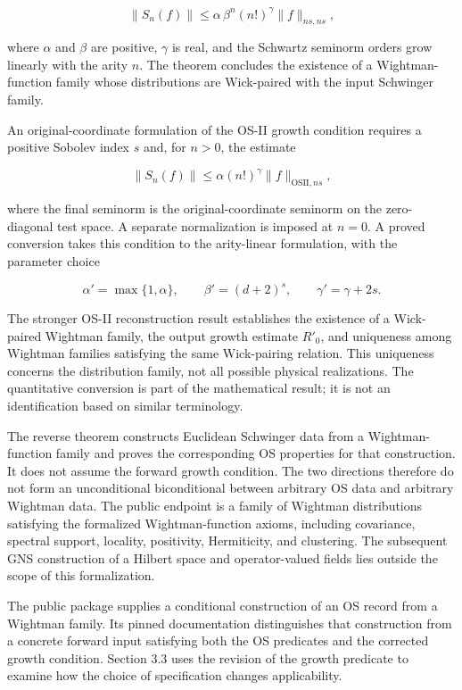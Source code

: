 \documentclass[pdflatex,sn-apa]{sn-jnl}
\begin{document}
\[
\|S_n(f)\|
\leq
\alpha\,\beta^n(n!)^\gamma
\|f\|_{ns,ns},
\]

where \(\alpha\) and \(\beta\) are positive, \(\gamma\) is real, and the Schwartz seminorm orders grow linearly with the arity \(n\). The theorem concludes the existence of a Wightman-function family whose distributions are Wick-paired with the input Schwinger family.

An original-coordinate formulation of the OS-II growth condition requires a positive Sobolev index \(s\) and, for \(n>0\), the estimate

\[
\|S_n(f)\|
\leq
\alpha (n!)^\gamma
\|f\|_{\mathrm{OSII},ns},
\]

where the final seminorm is the original-coordinate seminorm on the zero-diagonal test space. A separate normalization is imposed at \(n=0\). A proved conversion takes this condition to the arity-linear formulation, with the parameter choice

\[
\alpha' = \max\{1,\alpha\},\qquad
\beta'=(d+2)^s,\qquad
\gamma'=\gamma+2s.
\]

The stronger OS-II reconstruction result establishes the existence of a Wick-paired Wightman family, the output growth estimate \(R'_0\), and uniqueness among Wightman families satisfying the same Wick-pairing relation. This uniqueness concerns the distribution family, not all possible physical realizations. The quantitative conversion is part of the mathematical result; it is not an identification based on similar terminology.

The reverse theorem constructs Euclidean Schwinger data from a Wightman-function family and proves the corresponding OS properties for that construction. It does not assume the forward growth condition. The two directions therefore do not form an unconditional biconditional between arbitrary OS data and arbitrary Wightman data. The public endpoint is a family of Wightman distributions satisfying the formalized Wightman-function axioms, including covariance, spectral support, locality, positivity, Hermiticity, and clustering. The subsequent GNS construction of a Hilbert space and operator-valued fields lies outside the scope of this formalization.

The public package supplies a conditional construction of an OS record from a Wightman family. Its pinned documentation distinguishes that construction from a concrete forward input satisfying both the OS predicates and the corrected growth condition. Section 3.3 uses the revision of the growth predicate to examine how the choice of specification changes applicability.
\end{document}
